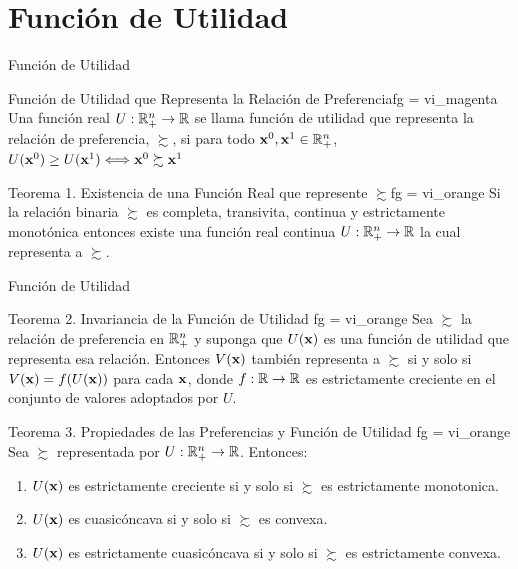 \documentclass[10pt,aspectratio=169]{beamer}  %
\begin{document}
\section{Función de Utilidad}

\begin{frame}{Función de Utilidad}
	
  \begin{varblock}{Función de Utilidad que Representa la Relación de Preferencia}{fg = vi_magenta}
    \vsf
	  Una función real $U: \mathbb{R}^{n}_{+} \rightarrow \mathbb{R}$ se llama función de utilidad que representa la
    relación de preferencia, $\succsim $, si para todo $\mathbf{x}^0, \mathbf{x}^1 \in \mathbb{R}^{n}_{+}$, $U(\mathbf{x}^0) \geq U(\mathbf{x}^1)
    \Longleftrightarrow \mathbf{x}^0 \succsim \mathbf{x}^1$
    \vsf
  \end{varblock}
\vspace{10pt} \pause
  \begin{varblock}{Teorema 1. Existencia de una Función Real que represente $\succsim $}{fg = vi_orange}
    \vsf
	  Si la relación binaria $\succsim $ es completa, transivita, continua y estrictamente monotónica entonces
    existe una función real continua $U: \mathbb{R}^{n}_{+} \rightarrow \mathbb{R}$ la cual representa a $\succsim$.
    \vsf
  \end{varblock}

\end{frame}

\begin{frame}{Función de Utilidad}
  \begin{varblock}{Teorema 2. Invariancia de la Función de Utilidad }{fg = vi_orange}
    \vsf
	  Sea $\succsim $ la relación de preferencia en $\mathbb{R}^{n}_{+}$ y suponga que $U(\mathbf{x})$ es una función de utilidad que
    representa esa relación. Entonces $V(\mathbf{x})$ también representa a $\succsim$ si y solo si $V(\mathbf{x}) = f(U(\mathbf{x}))$
    para cada $\mathbf{x}$, donde $f: \mathbb{R} \rightarrow \mathbb{R}$ es estrictamente creciente en el conjunto de valores 
    adoptados por $U$.
    \vsf
  \end{varblock}
\pause
  \begin{varblock}{Teorema 3. Propiedades de las Preferencias y Función de Utilidad }{fg = vi_orange}
    \vsf
    Sea $\succsim $ representada por $U: \mathbb{R}^{n}_{+} \rightarrow \mathbb{R}$. Entonces:
    \begin{enumerate}
      \item $U(\mathbf{x})$ es estrictamente creciente si y solo si $\succsim$ es estrictamente monotonica.
      \item $U(\mathbf{x})$ es cuasicóncava si y solo si $\succsim$ es convexa.
      \item $U(\mathbf{x})$ es estrictamente cuasicóncava si y solo si $\succsim$ es estrictamente convexa.
    \end{enumerate}
    \vsf
  \end{varblock}

  \end{frame}
\end{document}
